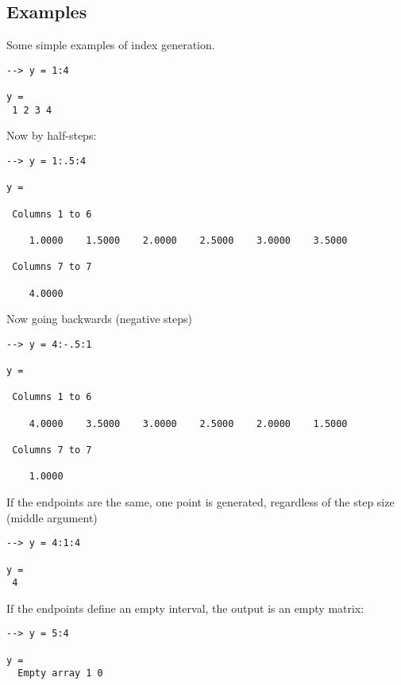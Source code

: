 \subsection{Examples}

Some simple examples of index generation.
\begin{verbatim}
--> y = 1:4

y = 
 1 2 3 4 
\end{verbatim}
Now by half-steps:
\begin{verbatim}
--> y = 1:.5:4

y = 

 Columns 1 to 6

    1.0000    1.5000    2.0000    2.5000    3.0000    3.5000 

 Columns 7 to 7

    4.0000 
\end{verbatim}
Now going backwards (negative steps)
\begin{verbatim}
--> y = 4:-.5:1

y = 

 Columns 1 to 6

    4.0000    3.5000    3.0000    2.5000    2.0000    1.5000 

 Columns 7 to 7

    1.0000 
\end{verbatim}
If the endpoints are the same, one point is generated, regardless of the step size (middle argument)
\begin{verbatim}
--> y = 4:1:4

y = 
 4 
\end{verbatim}
If the endpoints define an empty interval, the output is an empty matrix:
\begin{verbatim}
--> y = 5:4

y = 
  Empty array 1 0
\end{verbatim}

